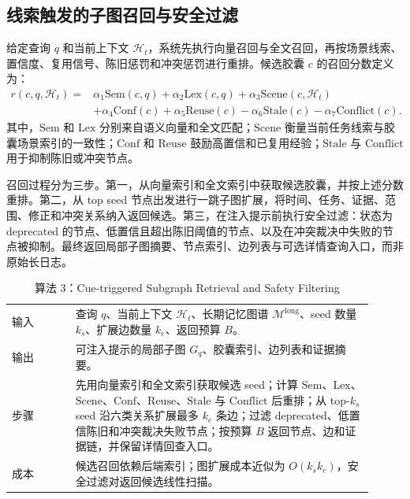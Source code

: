 \documentclass[a4paper,fleqn]{cas-sc}
\begin{document}
\begin{CJK*}{UTF8}{gbsn}
\subsection{线索触发的子图召回与安全过滤}

给定查询 $q$ 和当前上下文 $\mathcal{H}_t$，系统先执行向量召回与全文召回，再按场景线索、置信度、复用信号、陈旧惩罚和冲突惩罚进行重排。候选胶囊 $c$ 的召回分数定义为：
\begin{equation}
\begin{aligned}
r(c,q,\mathcal{H}_t)=&
\alpha_1\mathrm{Sem}(c,q)
+\alpha_2\mathrm{Lex}(c,q)
+\alpha_3\mathrm{Scene}(c,\mathcal{H}_t) \\
&+\alpha_4\mathrm{Conf}(c)
+\alpha_5\mathrm{Reuse}(c)
-\alpha_6\mathrm{Stale}(c)
-\alpha_7\mathrm{Conflict}(c).
\end{aligned}
\end{equation}
其中，$\mathrm{Sem}$ 和 $\mathrm{Lex}$ 分别来自语义向量和全文匹配；$\mathrm{Scene}$ 衡量当前任务线索与胶囊场景索引的一致性；$\mathrm{Conf}$ 和 $\mathrm{Reuse}$ 鼓励高置信和已复用经验；$\mathrm{Stale}$ 与 $\mathrm{Conflict}$ 用于抑制陈旧或冲突节点。

召回过程分为三步。第一，从向量索引和全文索引中获取候选胶囊，并按上述分数重排。第二，从 top seed 节点出发进行一跳子图扩展，将时间、任务、证据、范围、修正和冲突关系纳入返回候选。第三，在注入提示前执行安全过滤：状态为 deprecated 的节点、低置信且超出陈旧阈值的节点、以及在冲突裁决中失败的节点被抑制。最终返回局部子图摘要、节点索引、边列表与可选详情查询入口，而非原始长日志。

\begin{table}[t]
\centering
\scriptsize
\caption{算法 3：Cue-triggered Subgraph Retrieval and Safety Filtering}
\label{alg:subgraph-retrieval}
\setlength{\tabcolsep}{4pt}
\begin{tabular}{P{0.16\linewidth}P{0.75\linewidth}}
\toprule
输入 & 查询 $q$、当前上下文 $\mathcal{H}_t$、长期记忆图谱 $\mathcal{M}^{\text{long}}$、seed 数量 $k_s$、扩展边数量 $k_e$、返回预算 $B$。 \\
输出 & 可注入提示的局部子图 $G_q$、胶囊索引、边列表和证据摘要。 \\
步骤 & 先用向量索引和全文索引获取候选 seed；计算 $\mathrm{Sem}$、$\mathrm{Lex}$、$\mathrm{Scene}$、$\mathrm{Conf}$、$\mathrm{Reuse}$、$\mathrm{Stale}$ 与 $\mathrm{Conflict}$ 后重排；从 top-$k_s$ seed 沿六类关系扩展最多 $k_e$ 条边；过滤 deprecated、低置信陈旧和冲突裁决失败节点；按预算 $B$ 返回节点、边和证据链，并保留详情回查入口。 \\
成本 & 候选召回依赖后端索引；图扩展成本近似为 $O(k_s k_e)$，安全过滤对返回候选线性扫描。 \\
\bottomrule
\end{tabular}
\end{table}


\end{CJK*}
\end{document}
